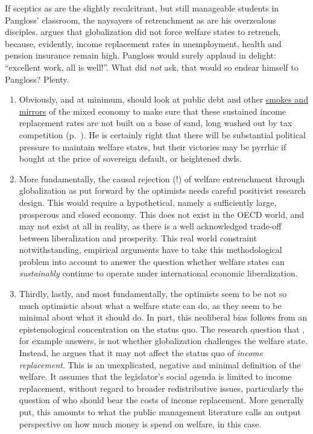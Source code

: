 If sceptics as \citeauthor{Beckfield2006} are the slightly recalcitrant, but still manageable students in Pangloss' classroom, the naysayers of retrenchment as \cite{Swank-2005-aa} are his overzealous disciples.
\citeauthor{Swank-2005-aa} argues that globalization did not force welfare states to retrench, because, evidently, income replacement rates in unemployment, health and pension insurance remain high.
Pangloss would surely applaud in delight:
``excellent work, all is well!''.
What did \citeauthor{Swank-2005-aa} \emph{not} ask, that would so endear himself to Pangloss?
Plenty.
\begin{enumerate}
	\item Obviously, and at minimum, \citeauthor{Swank-2005-aa} should look at public debt and other \hyperref[sec:smoke-n-mirrors]{smokes and mirrors} of the mixed economy to make sure that these sustained income replacement rates are not built on a base of sand, long washed out by tax competition (p.~\pageref{sec:smoke-n-mirrors}).
	He is certainly right that there will be substantial political pressure to maintain welfare states, but their victories may be pyrrhic if bought at the price of sovereign default, or heightened \glspl{dwl}.

	\item More fundamentally, the causal rejection (!) of welfare entrenchment through globalization as put forward by the optimists needs careful positivist research design.
	This would require a hypothetical, namely a sufficiently large, prosperous and closed economy.
	This does not exist in the OECD world, and may not exist at all in reality, as there is a well acknowledged trade-off between liberalization and prosperity.
	This real world constraint notwithstanding, empirical arguments have to take this methodological problem into account to answer the question whether welfare states can \emph{sustainably} continue to operate under international economic liberalization.

	\item Thirdly, lastly, and most fundamentally, the optimists seem to be not so much optimistic about what a welfare state can do, as they seem to be minimal about what it should do.
	In part, this neoliberal bias follows from an epistemological concentration on the status quo.
	The research question that \citeauthor{Swank-2005-aa}, for example answers, is not whether globalization challenges the welfare state.
	Instead, he argues that it may not affect the status quo of \emph{income replacement}.
	This is an unexplicated, negative and minimal definition of the welfare.
	It assumes that the legislator’s social agenda is limited to income replacement, without regard to broader redistributive issues, particularly the question of who should bear the costs of income replacement.
	More generally put, this amounts to what the public management literature calls an output perspective on how much money is spend on welfare, in this case.
\end{enumerate}

